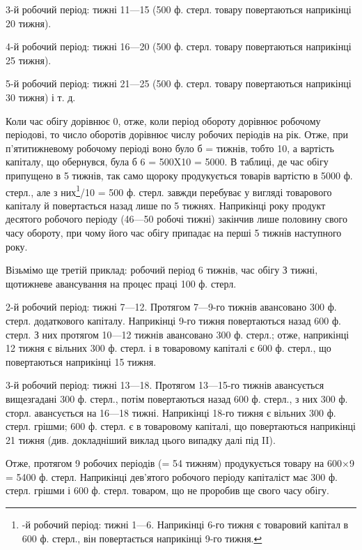 3-й робочий період: тижні 11—15 (500 ф. стерл. товару повертаються
наприкінці 20 тижня).

4-й робочий період: тижні 16—20 (500 ф. стерл. товару повертаються
наприкінці 25 тижня).

5-й робочий період: тижні 21—25 (500 ф. стерл. товару повертаються
наприкінці 30 тижня) і т. д.

Коли час обігу дорівнює 0, отже, коли період обороту дорівнює
робочому періодові, то число оборотів дорівнює числу робочих періодів
на рік.
Отже, при п’ятитижневому робочому періоді воно було б = 
тижнів, тобто 10, а вартість капіталу, що обернувся, була б 6 = 500X10 =
5000.
В таблиці, де час обігу припущено в 5 тижнів, так само щороку
продукується товарів вартістю в 5000 ф. стерл., але з них\footnote{
-й робочий період: тижні 1—6. Наприкінці 6-го тижня є товаровий
капітал в 600 ф. стерл., він повертається наприкінці 9-го тижня.
}/10 = 500 ф.
стерл. завжди перебуває у вигляді товарового капіталу й повертається
назад лише по 5 тижнях. Наприкінці року продукт десятого робочого
періоду (46—50 робочі тижні) закінчив лише половину свого часу
обороту, при чому його час обігу припадає на перші 5 тижнів наступного року.

Візьмімо ще третій приклад: робочий період 6 тижнів, час обігу
З тижні, щотижневе авансування на процес праці 100 ф. стерл.

2-й робочий період: тижні 7—12. Протягом 7—9-го тижнів авансовано
300 ф. стерл. додаткового капіталу. Наприкінці 9-го тижня повертаються
назад 600 ф. стерл. З них протягом 10—12 тижнів авансовано 300 ф.
стерл.; отже, наприкінці 12 тижня є вільних 300 ф. стерл. і в товаровому
капіталі є 600 ф. стерл., що повертаються наприкінці 15 тижня.

3-й робочий період: тижні 13—18. Протягом 13—15-го тижнів авансується
вищезгадані 300 ф. стерл., потім повертаються назад 600 ф. стерл.,
з них 300 ф. сторл. авансується на 16—18 тижні. Наприкінці 18-го тижня
є вільних 300 ф. стерл. грішми; 600 ф. стерл. є в товаровому капіталі,
що повертаються наприкінці 21 тижня (див. докладніший виклад
цього випадку далі під II).

Отже, протягом 9 робочих періодів (= 54 тижням) продукується товару
на 600×9 = 5400 ф. стерл. Наприкінці дев’ятого робочого періоду
капіталіст має 300 ф. стерл. грішми і 600 ф. стерл. товаром, що не
проробив ще свого часу обігу.


